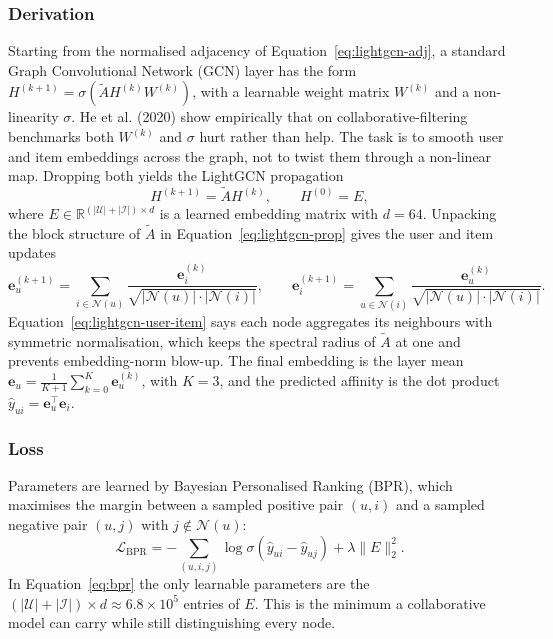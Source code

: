 \documentclass{article}
\begin{document}
\subsubsection*{Derivation}

Starting from the normalised adjacency of Equation~\ref{eq:lightgcn-adj}, a standard Graph Convolutional Network (GCN) layer has the form $H^{(k+1)} = \sigma(\tilde{A} H^{(k)} W^{(k)})$, with a learnable weight matrix $W^{(k)}$ and a non-linearity $\sigma$. He et al. (2020) show empirically that on collaborative-filtering benchmarks both $W^{(k)}$ and $\sigma$ hurt rather than help. The task is to smooth user and item embeddings across the graph, not to twist them through a non-linear map. Dropping both yields the LightGCN propagation
\begin{equation}
H^{(k+1)} = \tilde{A} H^{(k)}, \qquad H^{(0)} = E,
\label{eq:lightgcn-prop}
\end{equation}
where $E \in \mathbb{R}^{(|\mathcal{U}| + |\mathcal{I}|) \times d}$ is a learned embedding matrix with $d = 64$. Unpacking the block structure of $\tilde{A}$ in Equation~\ref{eq:lightgcn-prop} gives the user and item updates
\begin{equation}
\mathbf{e}_u^{(k+1)} = \sum_{i \in \mathcal{N}(u)} \frac{\mathbf{e}_i^{(k)}}{\sqrt{|\mathcal{N}(u)| \cdot |\mathcal{N}(i)|}}, \qquad \mathbf{e}_i^{(k+1)} = \sum_{u \in \mathcal{N}(i)} \frac{\mathbf{e}_u^{(k)}}{\sqrt{|\mathcal{N}(u)| \cdot |\mathcal{N}(i)|}}.
\label{eq:lightgcn-user-item}
\end{equation}
Equation~\ref{eq:lightgcn-user-item} says each node aggregates its neighbours with symmetric normalisation, which keeps the spectral radius of $\tilde{A}$ at one and prevents embedding-norm blow-up. The final embedding is the layer mean $\mathbf{e}_u = \frac{1}{K + 1} \sum_{k = 0}^{K} \mathbf{e}_u^{(k)}$, with $K = 3$, and the predicted affinity is the dot product $\hat{y}_{ui} = \mathbf{e}_u^\top \mathbf{e}_i$.

\subsubsection*{Loss}

Parameters are learned by Bayesian Personalised Ranking (BPR), which maximises the margin between a sampled positive pair $(u, i)$ and a sampled negative pair $(u, j)$ with $j \notin \mathcal{N}(u)$:
\begin{equation}
\mathcal{L}_{\text{BPR}} = -\sum_{(u, i, j)} \log \sigma(\hat{y}_{ui} - \hat{y}_{uj}) + \lambda \|E\|_2^2.
\label{eq:bpr}
\end{equation}
In Equation~\ref{eq:bpr} the only learnable parameters are the $(|\mathcal{U}| + |\mathcal{I}|) \times d \approx 6.8 \times 10^5$ entries of $E$. This is the minimum a collaborative model can carry while still distinguishing every node.
\end{document}
